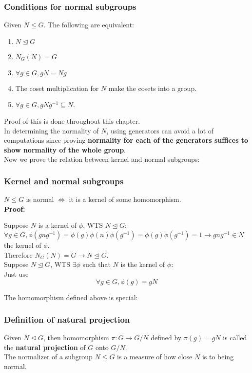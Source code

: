 \documentclass{article}
\begin{document}
\subsubsection*{Conditions for normal subgroups}
Given $N \leq G$. The following are equivalent:
\begin{enumerate}
    \item $N \trianglelefteq G$
    \item $N_G(N) = G$
    \item $\forall g \in G, gN = Ng$
    \item The coset multiplication for $N$ make the cosets into a group.
    \item $\forall g \in G, gNg^{-1} \subseteq N$.
\end{enumerate}
Proof of this is done throughout this chapter.\\
In determining the normality of $N$, using generators can avoid a lot of computations since proving \textbf{normality for each of the generators suffices to show normality of the whole group}.\\
Now we prove the relation between kernel and normal subgroups:
\subsubsection*{Kernel and normal subgroups}
$N \leq G$ is normal $\iff$ it is a kernel of some homomorphism.\\
\textbf{Proof:}
\begin{addmargin}[1em]{0em}
    Suppose $N$ is a kernel of $\phi$, WTS $N \trianglelefteq G$:\\
    $\forall g \in G, \phi(gng^{-1}) = \phi(g)\phi(n)\phi(g^{-1}) = \phi(g)\phi(g^{-1}) = 1 \rightarrow gng^{-1} \in N$ the kernel of $\phi$.\\
    Therefore $N_G(N) = G \rightarrow N \trianglelefteq G$.\\
    Suppose $N \trianglelefteq G$, WTS $\exists \phi$ such that $N$ is the kernel of $\phi$:\\
    Just use
    \begin{equation*}
        \forall g \in G, \phi(g) = gN
    \end{equation*}
\end{addmargin}
The homomorphism defined above is special:
\subsubsection*{Definition of natural projection}
Given $N \trianglelefteq G$, then homomorphism $\pi: G \rightarrow G/N$ defined by $\pi(g) = gN$ is called the \textbf{natural projection} of $G$ onto $G/N$.\\
The normalizer of a subgroup $N \leq G$ is a measure of how close $N$ is to being normal.
\end{document}
